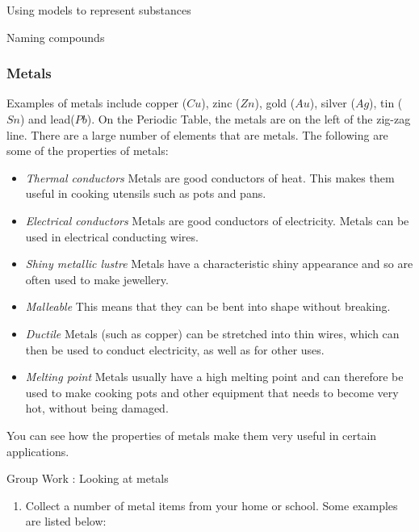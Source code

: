 \begin{activity}{Using models to represent substances}
\begin{exercise}{Naming compounds}
            \subsubsection{ Metals}
            \nopagebreak
        \label{m38708*id65726}Examples of metals include copper ($Cu$), zinc ($Zn$), gold ($Au$), silver ($Ag$), tin ($Sn$) and lead($Pb$). On the Periodic Table, the metals are on the left of the zig-zag line. There are a large number of elements that are metals. The following are some of the properties of metals:\par 
        \label{m38708*id65732}\begin{itemize}[noitemsep]
            \label{m38708*uid77}\item \textsl{Thermal conductors}
Metals are good conductors of heat. This makes them useful in cooking utensils such as pots and pans.
\label{m38708*uid78}\item \textsl{Electrical conductors}
Metals are good conductors of electricity. Metals can be used in electrical conducting wires.
\label{m38708*uid79}\item \textsl{Shiny metallic lustre}
Metals have a characteristic shiny appearance and so are often used to make jewellery.
\label{m38708*uid80}\item \textsl{Malleable}
This means that they can be bent into shape without breaking.
\label{m38708*uid81}\item \textsl{Ductile}
Metals (such as copper) can be stretched into thin wires, which can then be used to conduct electricity, as well as for other uses.
\label{m38708*uid82}\item \textsl{Melting point}
Metals usually have a high melting point and can therefore be used to make cooking pots and other equipment that needs to become very hot, without being damaged.
\end{itemize}
        \label{m38708*id65852}You can see how the properties of metals make them very useful in certain applications.\par 
\label{m38708*secfhsst!!!underscore!!!id320}
            \begin{Activity}{Group Work : Looking at metals}{
            \nopagebreak
        \label{m38708*id65869}\begin{enumerate}[noitemsep, label=\textbf{\arabic*}. ] 
            \label{m38708*uid83}\item Collect a number of metal items from your home or school. Some examples are listed below:

\end{enumerate}}
\end{Activity}
\end{exercise}
\end{activity}
